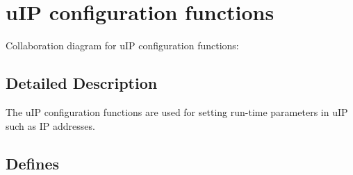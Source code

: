\hypertarget{a00061}{
\section{u\-IP configuration functions}
\label{a00061}
}


Collaboration diagram for u\-IP configuration functions:

\subsection{Detailed Description}
The u\-IP configuration functions are used for setting run-time parameters in u\-IP such as IP addresses. 



\subsection*{Defines}
